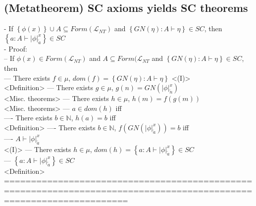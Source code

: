 \documentclass{book}
\newcommand{\set}[1]{\left\{ #1 \right\}}
\newcommand{\sub}[3]{\left|#1\right|_{#3}^{#2}}
\begin{document}
\subsection{(Metatheorem) SC axioms yields SC theorems} %
	- If $\set{\phi(x)} \cup A \subseteq Form(\mathcal{L}_{NT})$ and $\set{GN(\eta): A \vdash \eta} \in SC$, then $\set{a: A \vdash \sub{\phi}{x}{\overleftarrow{a}}} \in SC$ \\
	- Proof: \\
		-- If $\phi(x) \in Form(\mathcal{L}_{NT})$ and $A \subseteq Form(\mathcal{L}_{NT}$ and $\set{GN(\eta): A \vdash \eta} \in SC$, then \\
			--- There exists $f \in \mu$, $dom(f) = \set{GN(\eta): A \vdash \eta}$ <(I)> \\ <Definition>
			--- There exists $g \in \mu$, $g(n) = GN(\sub{\phi}{x}{\overleftarrow{n}})$ \\ <Misc. theorems>
			--- There exists $h \in \mu$, $h(m) = f(g(m))$ \\ <Misc. theorems>
			--- $a \in dom(h)$ iff \\
				---- There exists $b \in \mathbb{N}$, $h(a) = b$ iff \\ <Definition>
				---- There exists $b \in \mathbb{N}$, $f(GN(\sub{\phi}{x}{\overleftarrow{a}})) = b$ iff \\
				---- $A \vdash \sub{\phi}{x}{\overleftarrow{a}}$ \\ <(I)>
			--- There exists $h \in \mu$, $dom(h) = \set{a: A \vdash \sub{\phi}{x}{\overleftarrow{a}}} \in SC$ \\
			--- $\set{a: A \vdash \sub{\phi}{x}{\overleftarrow{a}}} \in SC$ \\ <Definition>
	===================================================================================================================
\end{document}
